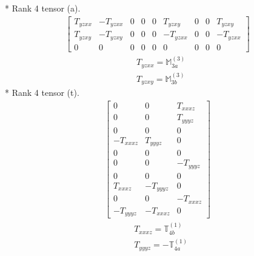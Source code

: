 \documentclass[fleqn,8pt,landscape]{jsarticle}
\begin{document}
* Rank 4 tensor (a).
\begin{align*}
\begin{bmatrix} T_{yzxx} & - T_{yzxx} & 0 & 0 & 0 & T_{yzxy} & 0 & 0 & T_{yzxy} \\ T_{yzxy} & - T_{yzxy} & 0 & 0 & 0 & - T_{yzxx} & 0 & 0 & - T_{yzxx} \\ 0 & 0 & 0 & 0 & 0 & 0 & 0 & 0 & 0 \end{bmatrix}
\end{align*}
\begin{align*}
& T_{yzxx} = \mathbb{M}_{3a}^{(3)} \\
& T_{yzxy} = \mathbb{M}_{3b}^{(3)}
\end{align*}
* Rank 4 tensor (t).
\begin{align*}
\begin{bmatrix} 0 & 0 & T_{xxxz} \\ 0 & 0 & T_{yyyz} \\ 0 & 0 & 0 \\ - T_{xxxz} & T_{yyyz} & 0 \\ 0 & 0 & 0 \\ 0 & 0 & - T_{yyyz} \\ 0 & 0 & 0 \\ T_{xxxz} & - T_{yyyz} & 0 \\ 0 & 0 & - T_{xxxz} \\ - T_{yyyz} & - T_{xxxz} & 0 \end{bmatrix}
\end{align*}
\begin{align*}
& T_{xxxz} = \mathbb{T}_{4b}^{(1)} \\
& T_{yyyz} = - \mathbb{T}_{4a}^{(1)}
\end{align*}
\end{document}
